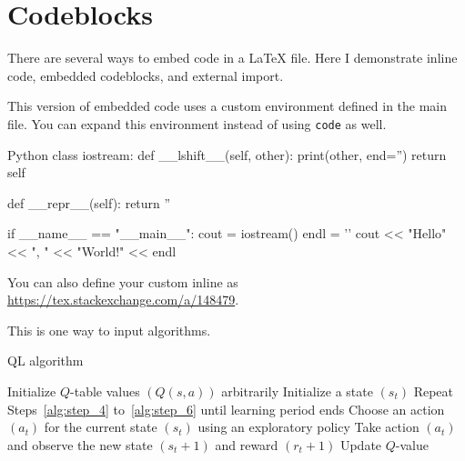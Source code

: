 \section{Codeblocks}
There are several ways to embed code in a \LaTeX{} file.
Here I demonstrate inline code, embedded codeblocks, and external import.

This version of embedded code uses a custom environment defined in the main file.
You can expand this environment instead of using \texttt{code} as well.

\begin{code}{Python}
  class iostream:
      def __lshift__(self, other):
          print(other, end='')
          return self

      def __repr__(self):
          return ''


  if __name__ == "__main__":
      cout = iostream()
      endl = '\n'
      cout << "Hello" << ", " << "World!" << endl
\end{code}


You can also define your custom inline as \url{https://tex.stackexchange.com/a/148479}.

This is one way to input algorithms.

\begin{algorithm}
  \caption{QL algorithm}
  Initialize \(Q\)-table values \((Q(s, a))\) arbitrarily\;
  Initialize a state \((s_t)\)\;
  Repeat Steps~\ref{alg:step_4} to~\ref{alg:step_6} until learning period ends\;
  Choose an action \((a_t)\) for the current state \((s_t)\) using an exploratory policy\; 
  Take action \((a_t)\) and observe the new state \((s_t + 1)\) and reward \((r_t + 1)\)\;
  Update \(Q\)-value\; 
\end{algorithm}
